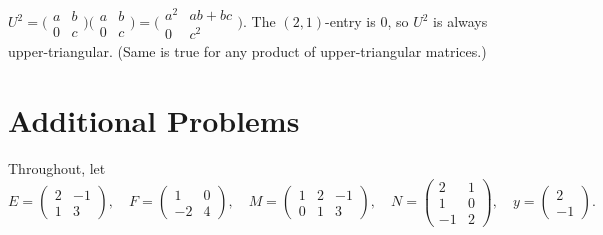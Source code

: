 \begin{solutions}
    \item $U^{2} = \bigl(\begin{smallmatrix} a & b \\ 0 & c \end{smallmatrix}\bigr)\bigl(\begin{smallmatrix} a & b \\ 0 & c \end{smallmatrix}\bigr) = \bigl(\begin{smallmatrix} a^{2} & a b + b c \\ 0 & c^{2} \end{smallmatrix}\bigr)$. The $(2, 1)$-entry is $0$, so $U^{2}$ is always upper-triangular. (Same is true for any product of upper-triangular matrices.)
\end{solutions}

\section{Additional Problems}

Throughout, let
\[
E = \begin{pmatrix} 2 & -1 \\ 1 & 3 \end{pmatrix}, \quad
F = \begin{pmatrix} 1 & 0 \\ -2 & 4 \end{pmatrix}, \quad
M = \begin{pmatrix} 1 & 2 & -1 \\ 0 & 1 & 3 \end{pmatrix}, \quad
N = \begin{pmatrix} 2 & 1 \\ 1 & 0 \\ -1 & 2 \end{pmatrix}, \quad y = \begin{pmatrix} 2 \\ -1 \end{pmatrix}.
\]

